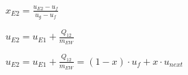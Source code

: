 \( x_{E2} = \frac{u_{E2} - u_f}{u_g - u_f} \)  

\( u_{E2} = u_{E1} + \frac{Q_{12}}{m_{EW}} \)  

\( u_{E2} = u_{E1} + \frac{Q_{12}}{m_{EW}} = (1 - x) \cdot u_f + x \cdot u_{next} \)